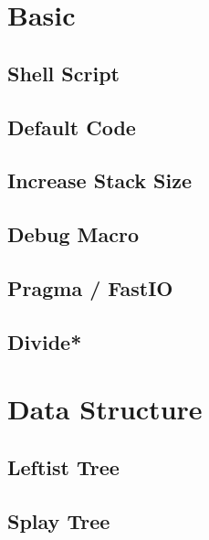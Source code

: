 \section{Basic}
\subsection{Shell Script}

\subsection{Default Code}

% 
\subsection{Increase Stack Size}

\subsection{Debug Macro}

% 
\subsection{Pragma / FastIO}

\subsection{Divide*}


\section{Data Structure}
\subsection{Leftist Tree}

\subsection{Splay Tree}

